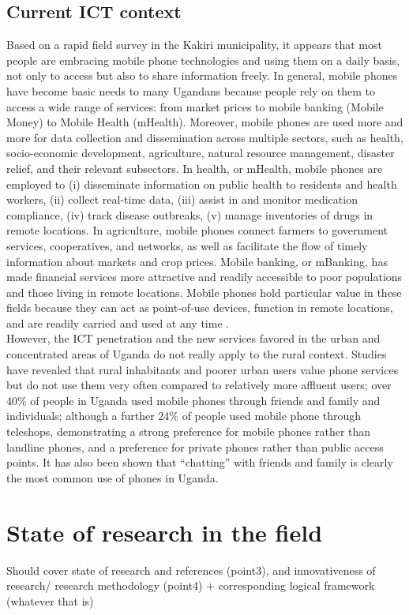 \documentclass[11pt]{article}
\begin{document}
\subsection{Current ICT context}
Based on a rapid field survey in the Kakiri municipality, it appears that most people are embracing mobile phone technologies and using them on a daily basis, not only to access but also to share information freely. In general, mobile phones have become basic needs to many Ugandans because people rely on them to access a wide range of services: from market prices to mobile banking (Mobile Money) to Mobile Health (mHealth).
Moreover, mobile phones are used more and more for data collection and dissemination across multiple sectors, such as health, socio-economic development, agriculture, natural resource management, disaster relief, and their relevant subsectors. In health, or mHealth, mobile phones are employed to (i) disseminate information on public health to residents and health workers, (ii) collect real-time data, (iii) assist in and monitor medication compliance, (iv) track disease outbreaks, (v) manage inventories of drugs in remote locations. In agriculture, mobile phones connect farmers to government services, cooperatives, and networks, as well as facilitate the flow of timely information about markets and crop prices. Mobile banking, or mBanking, has made financial services more attractive and readily accessible to poor populations and those living in remote locations\cite{Rikke10}. Mobile phones hold particular value in these fields because they can act as point-of-use devices, function in remote locations, and are readily carried and used at any time \cite{Kimberly11}\cite{Rikke10}.
\\
However, the ICT penetration and the new services favored in the urban and concentrated areas of Uganda do not really apply to the rural context. Studies have revealed that rural inhabitants and poorer urban users value phone services but do not use them very often compared to relatively more affluent users; over 40\% of people in Uganda used mobile phones through friends and family and individuals; although a further 24\% of people used mobile phone through teleshops, demonstrating a strong preference for mobile phones rather than landline phones, and a preference for private phones rather than public access points. It has also been shown that “chatting” with friends and family is clearly the most common use of phones in Uganda\cite{ Scott04}.

\section{State of research in the field}\label{state_of_research}
Should cover state of research and references (point3), and innovativeness of research/ research methodology (point4) + corresponding logical framework (whatever that is)
\end{document}

